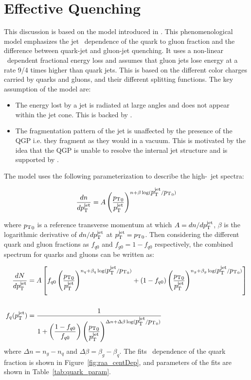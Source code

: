 \section{Effective Quenching}
This discussion is based on the model introduced in \cite{Spousta:2015fca}. This phenomenological model emphasizes the jet \pt\ dependence of the quark to gluon fraction and the difference between quark-jet and gluon-jet quenching. It uses a non-linear \pt\ dependent fractional energy loss and assumes that gluon jets lose energy at a rate 9/4 times higher than quark jets. This is based on the different color charges carried by quarks and gluons, and their different splitting functions. 
The key assumption of the model are:
\begin{itemize}
\item The energy lost by a jet is radiated at large angles and does not appear within the jet cone. This is backed by \cite{Chatrchyan:2011sx}.
\item The fragmentation pattern of the jet is unaffected by the presence of the QGP i.e. they fragment as they would in a vacuum. This is motivated by the idea that the QGP is unable to resolve the internal jet structure and is supported by \cite{Blaizot:2013hx, CasalderreySolana:2012ef}.
\end{itemize} 

The model uses the following parameterization to describe the high-\pt\ jet spectra:

\begin{align}
\frac{dn}{d\mbox{$p_{\mathrm{T}}^{\mathrm{jet}}$}} = A \left( \frac{\mbox{$p_{\mathrm{T}}$}_0}{\mbox{$p_{\mathrm{T}}^{\mathrm{jet}}$}} \right) ^{n+\beta \log(\mbox{$p_{\mathrm{T}}^{\mathrm{jet}}$} / \mbox{$p_{\mathrm{T}}$}_0)}
\end{align}

where $\mbox{$p_{\mathrm{T}}$}_0$ is a reference transverse momentum at which $A= dn/d\mbox{$p_{\mathrm{T}}^{\mathrm{jet}}$}$, $\beta$ is the logarithmic derivative of $dn/d\mbox{$p_{\mathrm{T}}^{\mathrm{jet}}$}$ at $\mbox{$p_{\mathrm{T}}^{\mathrm{jet}}$} = \mbox{$p_{\mathrm{T}}$}_0$. Then considering the different quark and gluon fractions as $f_{q0}$ and $f_{g0} = 1-f_{q0}$ respectively, the combined spectrum for quarks and gluons can be written as:

\begin{align}
 \frac{dN}{d\mbox{$p_{\mathrm{T}}^{\mathrm{jet}}$}} &= A \left[ f_{q0} \left( \frac{\mbox{$p_{\mathrm{T}}$}_0}{\mbox{$p_{\mathrm{T}}^{\mathrm{jet}}$}} \right)^{n_q+ \beta_q \log(\mbox{$p_{\mathrm{T}}^{\mathrm{jet}}$} / \mbox{$p_{\mathrm{T}}$}_0)} + (1-f_{q0}) \left( \frac{\mbox{$p_{\mathrm{T}}$}_0}{\mbox{$p_{\mathrm{T}}^{\mathrm{jet}}$}} \right)^{n_g + \beta_g \log(\mbox{$p_{\mathrm{T}}^{\mathrm{jet}}$} / \mbox{$p_{\mathrm{T}}$}_0)} \right] \\
\nonumber \\ 
\label{eq_q_frac} f_q (\mbox{$p_{\mathrm{T}}^{\mathrm{jet}}$}) &= \dfrac{1}{1 + \left(\dfrac{1-f_{q0}}{f_{q0}}\right) \left( \dfrac{\mbox{$p_{\mathrm{T}}$}_0}{\mbox{$p_{\mathrm{T}}^{\mathrm{jet}}$}}\right)^{\Delta n + \Delta \beta \log(\mbox{$p_{\mathrm{T}}^{\mathrm{jet}}$}/\mbox{$p_{\mathrm{T}}$}_0)} }
\end{align}
where $\Delta n = n_g - n_q$ and $\Delta \beta = \beta_g - \beta_q$.
The fits \pt\ dependence of the quark fraction is shown in Figure~\ref{fig:raa_centDep}, and parameters of the fits are shown in Table~\ref{tab:quark_param}.

